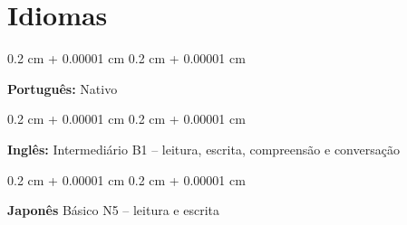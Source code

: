 \documentclass[10pt, letterpaper]{article}
\newenvironment{onecolentry}{
    \begin{adjustwidth}{
        0.2 cm + 0.00001 cm
    }{
        0.2 cm + 0.00001 cm
    }
}{
    \end{adjustwidth}
} %
\begin{document}
    \section{Idiomas}

        \begin{onecolentry}
            \textbf{Português:} Nativo
        \end{onecolentry}

        \vspace{0.1 cm}
        \begin{onecolentry}
            \textbf{Inglês:} Intermediário B1 – leitura, escrita, compreensão e conversação
        \end{onecolentry}

        \vspace{0.1 cm}
        \begin{onecolentry}
            \textbf{Japonês} Básico N5 – leitura e escrita
        \end{onecolentry}

        
\end{document}
